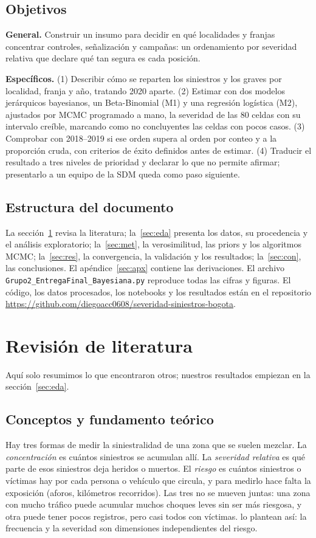\documentclass[10pt,twocolumn]{article}
\begin{document}
\subsection{Objetivos}
\textbf{General.} Construir un insumo para decidir en qué localidades y franjas concentrar controles, señalización y campañas: un ordenamiento por severidad relativa que declare qué tan segura es cada posición.

\textbf{Específicos.} (1) Describir cómo se reparten los siniestros y los graves por localidad, franja y año, tratando 2020 aparte. (2) Estimar con dos modelos jerárquicos bayesianos, un Beta-Binomial (M1) y una regresión logística (M2), ajustados por MCMC programado a mano, la severidad de las 80 celdas con su intervalo creíble, marcando como no concluyentes las celdas con pocos casos. (3) Comprobar con 2018--2019 si ese orden supera al orden por conteo y a la proporción cruda, con criterios de éxito definidos antes de estimar. (4) Traducir el resultado a tres niveles de prioridad y declarar lo que no permite afirmar; presentarlo a un equipo de la SDM queda como paso siguiente.

\subsection{Estructura del documento}\label{sec:estructura}
La sección~\ref{sec:lit} revisa la literatura; la~\ref{sec:eda} presenta los datos, su procedencia y el análisis exploratorio; la~\ref{sec:met}, la verosimilitud, las priors y los algoritmos MCMC; la~\ref{sec:res}, la convergencia, la validación y los resultados; la~\ref{sec:con}, las conclusiones. El apéndice~\ref{sec:apx} contiene las derivaciones. El archivo \texttt{Grupo2\_EntregaFinal\_Bayesiana.py} reproduce todas las cifras y figuras. El código, los datos procesados, los notebooks y los resultados están en el repositorio \url{https://github.com/diegoacc0608/severidad-siniestros-bogota}.

\section{Revisión de literatura}\label{sec:lit}
Aquí solo resumimos lo que encontraron otros; nuestros resultados empiezan en la sección~\ref{sec:eda}.

\subsection{Conceptos y fundamento teórico}
Hay tres formas de medir la siniestralidad de una zona que se suelen mezclar. La \emph{concentración} es cuántos siniestros se acumulan allí. La \emph{severidad relativa} es qué parte de esos siniestros deja heridos o muertos. El \emph{riesgo} es cuántos siniestros o víctimas hay por cada persona o vehículo que circula, y para medirlo hace falta la exposición (aforos, kilómetros recorridos). Las tres no se mueven juntas: una zona con mucho tráfico puede acumular muchos choques leves sin ser más riesgosa, y otra puede tener pocos registros, pero casi todos con víctimas. \citet{stipancic2019network} lo plantean así: la frecuencia y la severidad son dimensiones independientes del riesgo.
\end{document}
